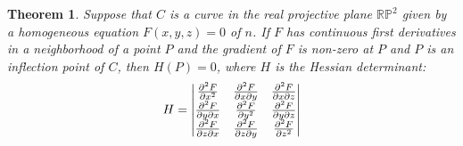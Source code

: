 \documentclass[12pt]{article}
\newtheorem{thm}{Theorem}
\begin{document}
\begin{thm}
Suppose that $C$ is a curve in the real projective plane 
$\mathbb{R}\mathbb{P}^2$ given by a homogeneous
equation $F(x,y,z) = 0$ of 
 $n$.
If $F$ has continuous first derivatives in a neighborhood of 
a point $P$ and the gradient of $F$ is non-zero at $P$ and $P$ 
is an inflection point of $C$, then $H(P) = 0$, where $H$ is 
the Hessian determinant:
\[
 H = \left| \begin{matrix}
   {\partial^2 F \over \partial x^2} &
   {\partial^2 F \over \partial x \partial y} &
   {\partial^2 F \over \partial x \partial z} \\
   {\partial^2 F \over \partial y \partial x} &
   {\partial^2 F \over \partial y^2} &
   {\partial^2 F \over \partial y \partial z} \\
   {\partial^2 F \over \partial z \partial x} &
   {\partial^2 F \over \partial z \partial y} &
   {\partial^2 F \over \partial z^2}
 \end{matrix} \right|
\]
\end{thm}
\end{document}
